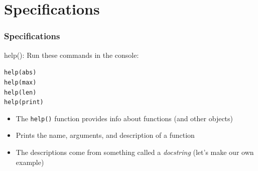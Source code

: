 \documentclass{beamer}
\newcommand{\code}[1]{\texttt{#1}}
\begin{document}
\section{Specifications}

\begin{frame}	
\end{frame}

\begin{frame}%
	\frametitle{Specifications}
	
	\begin{block}{help():}
		Run these commands in the console:
		
		\vspace{15pt}
			\code{help(abs) \\
			help(max) \\
			help(len) \\
			help(print) \\
			}
		\endminipage\hfill
			\begin{itemize}
				\item The \code{help()} function provides info about functions (and other objects)
				\item Prints the name, arguments, and description of a function
				\item The descriptions come from something called a \emph{docstring} (let's make our own example)
			\end{itemize}
		\endminipage\hfill
	\end{block}
	
\end{frame}
\end{document}
